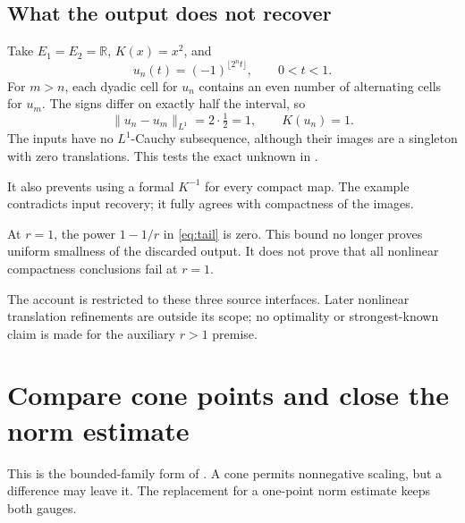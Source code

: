 \documentclass[12pt,reqno]{amsart}
\begin{document}
\subsection{What the output does not recover}

Take $E_1=E_2=\mathbb R$, $K(x)=x^2$, and
\[
u_n(t)=(-1)^{\lfloor2^nt\rfloor},\qquad 0<t<1.
\]
For $m>n$, each dyadic cell for $u_n$ contains an even number of alternating cells for $u_m$. The signs differ on exactly half the interval, so
\[
\|u_n-u_m\|_{L^1}=2\cdot\tfrac12=1,
\qquad K(u_n)=1.
\]
The inputs have no $L^1$-Cauchy subsequence, although their images are a singleton with zero translations. This tests the exact unknown in \cite[Theorem 2.1 and Remark 2.2(3), p.~1726]{S-maitre}.

It also prevents using a formal $K^{-1}$ for every compact map. The example contradicts input recovery; it fully agrees with compactness of the images.

At $r=1$, the power $1-1/r$ in \eqref{eq:tail} is zero. This bound no longer proves uniform smallness of the discarded output. It does not prove that all nonlinear compactness conclusions fail at $r=1$.

The account is restricted to these three source interfaces. Later nonlinear translation refinements are outside its scope; no optimality or strongest-known claim is made for the auxiliary $r>1$ premise.

\section{Compare cone points and close the norm estimate}

\begin{theorem}\label{thm:cone}

\end{theorem}

This is the bounded-family form of \cite[Theorem 1, pp.~3--4]{S-barrett-suli}. A cone permits nonnegative scaling, but a difference may leave it. The replacement for a one-point norm estimate keeps both gauges.

\begin{lemma}\label{lem:ehrling}

\end{lemma}
\end{document}
